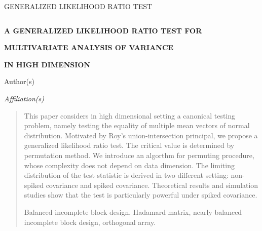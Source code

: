 \documentclass[12pt]{article} %
\theoremstyle{definition}
\begin{document}

\renewcommand{\baselinestretch}{2}


{\hfill {\footnotesize\rm GENERALIZED LIKELIHOOD RATIO TEST} \hfill}

\renewcommand{\thefootnote}{}
$\ $\par


\fontsize{12}{14pt plus.8pt minus .6pt}\selectfont \vspace{0.8pc}
\centerline{\large\bf A GENERALIZED LIKELIHOOD RATIO TEST FOR }
\vspace{2pt} \centerline{\large\bf MULTIVARIATE ANALYSIS OF VARIANCE}
\vspace{2pt} \centerline{\large\bf IN HIGH DIMENSION}
\vspace{.4cm} \centerline{Author(s)} \vspace{.4cm} \centerline{\it
Affiliation(s)} \vspace{.55cm} \fontsize{9}{11.5pt plus.8pt minus
.6pt}\selectfont


\begin{quotation}
This paper considers in high dimensional setting a canonical testing problem, namely testing the equality of multiple mean vectors of normal distribution.
    Motivated by Roy's union-intersection principal, we propose a generalized likelihood ratio test.
    The critical value is determined by permutation method.
    We introduce an algorthm for permuting procedure, whose complexity does not depend on data dimension.
    The limiting distribution of the test statistic is derived in two different setting: non-spiked covariance and spiked covariance.
    Theoretical results and simulation studies show that the test is particularly powerful under spiked covariance.

\vspace{9pt}
Balanced incomplete block design, Hadamard matrix, nearly balanced incomplete block design, orthogonal array.
\par
\end{quotation}\par
\end{document}
